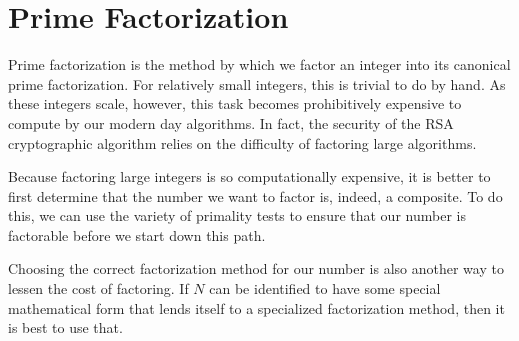 \documentclass{article}
\begin{document}
\newpage



\section{Prime Factorization}

\par Prime factorization is the method by which we factor an integer into its canonical prime factorization.
For relatively small integers, this is trivial to do by hand. As these integers scale, however, this task
becomes prohibitively expensive to compute by our modern day algorithms. In fact, the security of the RSA
cryptographic algorithm relies on the difficulty of factoring large algorithms.

\par Because factoring large integers is so computationally expensive, it is better to first determine that
the number we want to factor is, indeed, a composite. To do this, we can use the variety of primality tests
to ensure that our number is factorable before we start down this path.

\par Choosing the correct factorization method for our number is also another way to lessen the cost of
factoring. If $N$ can be identified to have some special mathematical form that lends itself to a specialized
factorization method, then it is best to use that.
\end{document}

